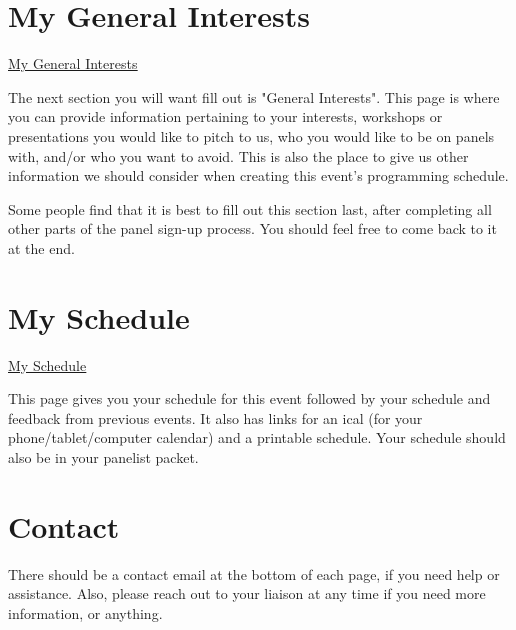 \documentclass[captions=tablesignature]{scrartcl}
\begin{document}
\section{My General Interests}
\label{sec-7}
\label{my_interests.php}
\underline{
\href{../webpages/my_interests.php}{My General Interests}
}

The next section you will want fill out is "General Interests". This
page is where you can provide information pertaining to your
interests, workshops or presentations you would like to pitch to us,
who you would like to be on panels with, and/or who you want to
avoid.  This is also the place to give us other information we
should consider when creating this event's programming schedule.

Some people find that it is best to fill out this section last,
after completing all other parts of the panel sign-up process.  You
should feel free to come back to it at the end.

\section{My Schedule}
\label{sec-8}
\label{MySchedule.php}
\underline{
\href{../webpages/MySchedule.php}{My Schedule}
}

This page gives you your schedule for this event followed by your
schedule and feedback from previous events.  It also has links for
an ical (for your phone/tablet/computer calendar) and a printable
schedule.  Your schedule should also be in your panelist packet.

\section{Contact}
\label{sec-9}

There should be a contact email at the bottom of each page, if you
need help or assistance.  Also, please reach out to your liaison at
any time if you need more information, or anything.
\end{document}
